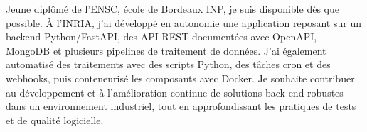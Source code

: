
\begin{cvparagraph}
Jeune diplômé de l’ENSC, école de Bordeaux INP, je suis disponible dès que possible. À l’INRIA, j’ai développé en autonomie une application reposant sur un backend Python/FastAPI, des API REST documentées avec OpenAPI, MongoDB et plusieurs pipelines de traitement de données. J’ai également automatisé des traitements avec des scripts Python, des tâches cron et des webhooks, puis conteneurisé les composants avec Docker. Je souhaite contribuer au développement et à l’amélioration continue de solutions back-end robustes dans un environnement industriel, tout en approfondissant les pratiques de tests et de qualité logicielle.
\end{cvparagraph}
